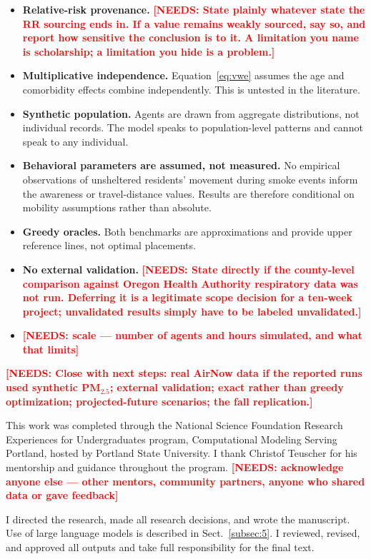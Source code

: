 \documentclass[graybox]{svmult}
\newcommand{\NEEDS}[1]{\textcolor{red}{\textbf{[NEEDS: #1]}}}
\begin{document}
\begin{itemize}

\item \textbf{Relative-risk provenance.} \NEEDS{State plainly whatever state the
RR sourcing ends in. If a value remains weakly sourced, say so, and report how
sensitive the conclusion is to it. A limitation you name is scholarship; a
limitation you hide is a problem.}

\item \textbf{Multiplicative independence.} Equation~\ref{eq:vwe} assumes the age
and comorbidity effects combine independently. This is untested in the
literature.

\item \textbf{Synthetic population.} Agents are drawn from aggregate
distributions, not individual records. The model speaks to population-level
patterns and cannot speak to any individual.

\item \textbf{Behavioral parameters are assumed, not measured.} No empirical
observations of unsheltered residents' movement during smoke events inform the
awareness or travel-distance values. Results are therefore conditional on
mobility assumptions rather than absolute.

\item \textbf{Greedy oracles.} Both benchmarks are approximations and provide
upper reference lines, not optimal placements.

\item \textbf{No external validation.} \NEEDS{State directly if the county-level
comparison against Oregon Health Authority respiratory data was not run.
Deferring it is a legitimate scope decision for a ten-week project; unvalidated
results simply have to be labeled unvalidated.}

\item \NEEDS{scale --- number of agents and hours simulated, and what that limits}

\end{itemize}

\NEEDS{Close with next steps: real AirNow data if the reported runs used
synthetic PM$_{2.5}$; external validation; exact rather than greedy optimization;
projected-future scenarios; the fall replication.}

\begin{acknowledgement}
This work was completed through the National Science Foundation Research
Experiences for Undergraduates program, Computational Modeling Serving Portland,
hosted by Portland State University. I thank Christof Teuscher for his mentorship
and guidance throughout the program.
\NEEDS{acknowledge anyone else --- other mentors, community partners, anyone who
shared data or gave feedback}

I directed the research, made all research decisions, and wrote the manuscript.
Use of large language models is described in Sect.~\ref{subsec:5}. I reviewed,
revised, and approved all outputs and take full responsibility for the final
text.
\end{acknowledgement}
\end{document}
